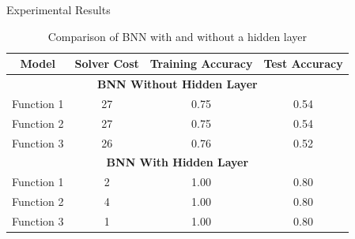 \documentclass[12pt]{beamer}
\begin{document}
\begin{frame}{Experimental Results}
\begin{table}[H]
    \centering
    \begin{tabular}{|c|c|c|c|}
        \hline
        \textbf{Model} & \textbf{Solver Cost} & \textbf{Training Accuracy} & \textbf{Test Accuracy} \\ 
        \hline
        \multicolumn{4}{|c|}{\textbf{BNN Without Hidden Layer}} \\
        \hline
        Function 1 & 27 & 0.75 & 0.54 \\
        Function 2 & 27 & 0.75 & 0.54 \\
        Function 3 & 26 & 0.76 & 0.52 \\
        \hline
        \multicolumn{4}{|c|}{\textbf{BNN With Hidden Layer}} \\
        \hline
        Function 1 & 2 & 1.00 & 0.80 \\
        Function 2 & 4 & 1.00 & 0.80 \\
        Function 3 & 1 & 1.00 & 0.80 \\
        \hline
    \end{tabular}
    \caption{Comparison of BNN with and without a hidden layer}
\end{table}
\end{frame}
\end{document}

